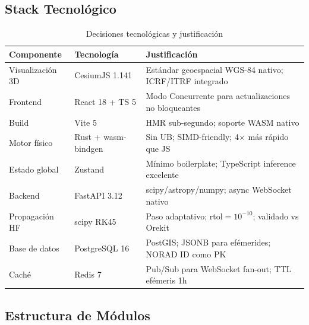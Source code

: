 \documentclass[12pt,a4paper]{article}
\begin{document}
\subsection{Stack Tecnol\'ogico}

\begin{table}[H]
\centering
\caption{Decisiones tecnol\'ogicas y justificaci\'on}
\label{tab:stack}
\begin{tabularx}{\textwidth}{p{2.8cm}p{2.8cm}X}
\toprule
\textbf{Componente} & \textbf{Tecnolog\'ia} & \textbf{Justificaci\'on} \\
\midrule
Visualizaci\'on 3D  & CesiumJS 1.141      & Est\'andar geoespacial WGS-84 nativo; ICRF/ITRF integrado \\
Frontend            & React 18 + TS 5     & Modo Concurrente para actualizaciones no bloqueantes \\
Build               & Vite 5              & HMR sub-segundo; soporte WASM nativo \\
Motor f\'isico      & Rust + wasm-bindgen & Sin UB; SIMD-friendly; 4$\times$ m\'as r\'apido que JS \\
Estado global       & Zustand             & M\'inimo boilerplate; TypeScript inference excelente \\
Backend             & FastAPI 3.12        & scipy/astropy/numpy; async WebSocket nativo \\
Propagaci\'on HF    & scipy RK45          & Paso adaptativo; rtol$=10^{-10}$; validado vs Orekit \\
Base de datos       & PostgreSQL 16       & PostGIS; JSONB para ef\'emerides; NORAD ID como PK \\
Cach\'e             & Redis 7             & Pub/Sub para WebSocket fan-out; TTL ef\'emeris 1h \\
\bottomrule
\end{tabularx}
\end{table}

\subsection{Estructura de M\'odulos}
\end{document}

